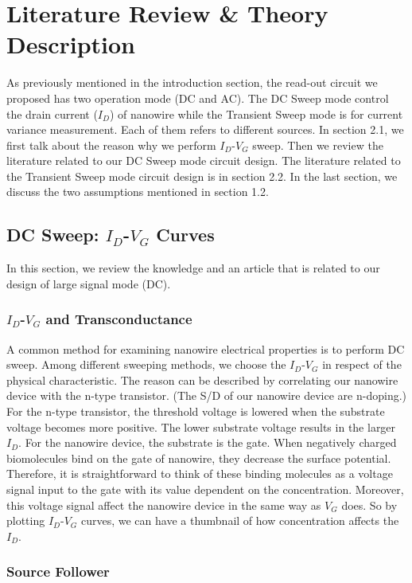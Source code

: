 \chapter{Literature Review \& Theory Description}
As previously mentioned in the introduction section, the read-out circuit we proposed has two operation mode (DC and AC).
The DC Sweep mode control the drain current ($I_D$) of nanowire while the Transient Sweep mode is for current variance measurement.
Each of them refers to different sources.
In section 2.1, we first talk about the reason why we perform $I_D$-$V_G$ sweep.
Then we review the literature related to our DC Sweep mode circuit design.
The literature related to the Transient Sweep mode circuit design is in section 2.2.
In the last section, we discuss the two assumptions mentioned in section 1.2.

\section{DC Sweep: $I_D$-$V_G$ Curves}
In this section, we review the knowledge and an article that is related to our design of large signal mode (DC).

\subsection{$I_D$-$V_G$ and Transconductance}
A common method for examining nanowire electrical properties is to perform DC sweep.
Among different sweeping methods, we choose the $I_D$-$V_G$ in respect of the physical characteristic.
The reason can be described by correlating our nanowire device with the n-type transistor.
(The S/D of our nanowire device are n-doping.)
For the n-type transistor, the threshold voltage is lowered when the substrate voltage becomes more positive.
The lower substrate voltage results in the larger $I_D$.
{\color{red}For the nanowire device, the substrate is the gate.}
When negatively charged biomolecules bind on the gate of nanowire, they decrease the surface potential.
Therefore, it is straightforward to think of these binding molecules as a voltage signal input to the gate with its value dependent on the concentration.
Moreover, this voltage signal affect the nanowire device in the same way as $V_G$ does.
So by plotting $I_D$-$V_G$  curves, we can have a thumbnail of how concentration affects the $I_D$.


\subsection{Source Follower} \label{section:SF}

